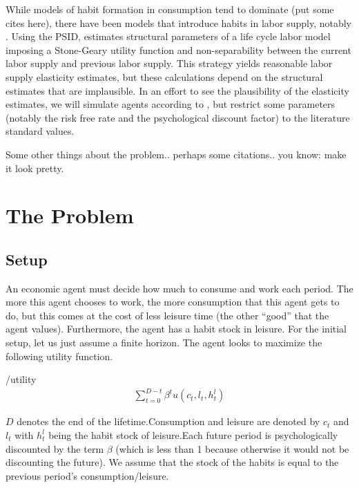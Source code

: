 \documentclass[ProjectMMD]{subfiles}
\begin{document}
While models of habit formation in consumption tend to dominate (put some cites here), there have been models that introduce habits in labor supply, notably \cite{bover1991relaxing}. Using the PSID, \cite{bover1991relaxing} estimates structural parameters of a life cycle labor model imposing a Stone-Geary utility function and non-separability between the current labor supply and previous labor supply. This strategy yields reasonable labor supply elasticity estimates, but these calculations depend on the structural estimates that are implausible. In an effort to see the plausibility of the elasticity estimates, we will simulate agents according to \cite{bover1991relaxing}, but restrict some parameters (notably the risk free rate and the psychological discount factor) to the literature standard values.

Some other things about the problem.. perhaps some citations.. you know: make it look pretty.
\section{The Problem}

\subsection{Setup}\label{subsec:Setup}
An economic agent must decide how much to consume and work each period. The more this agent chooses to work, the more consumption that this agent gets to do, but this comes at the cost of less leisure time (the other ``good'' that the agent values). Furthermore, the agent has a habit stock in leisure. For the initial setup, let us just assume a finite horizon. The agent looks to maximize the following utility function.
\hypertarget{utility}{}
\begin{verbatimwrite}{\EqDir/utility}
  \begin{align}
    \sum_{t=0}^{D-t}\beta^t u(c_t, l_t, h_t^l)
  \end{align}
\end{verbatimwrite}


$D$ denotes the end of the lifetime.Consumption and leisure are denoted by $c_t$ and $l_t$ with $h_t^l$ being the habit stock of leisure.Each future period is psychologically discounted by the term $\beta$ (which is less than 1 because otherwise it would not be discounting the future). We assume that the stock of the habits is equal to the previous period's consumption/leisure.
\end{document}
